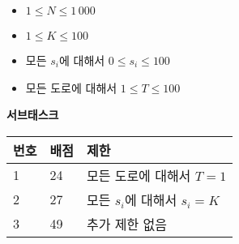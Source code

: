 \begin{itemize}
\item $1 \le N \le 1\,000$
\item $1 \le K \le 100$
\item 모든 $s_i$에 대해서 $0 \le s_{i} \le 100$
\item 모든 도로에 대해서 $1 \le T \le 100$
\end{itemize}

\textbf{서브태스크}
\begin{tabular}{|l|l|l|} \hline
  \textbf{번호} & \textbf{배점} & \textbf{제한} \\ \hline
  1 & 24 & 모든 도로에 대해서 $T = 1$ \\ \hline
  2 & 27 & 모든 $s_i$에 대해서 $s_i = K$ \\ \hline
  3 & 49 & 추가 제한 없음 \\ \hline
\end{tabular}